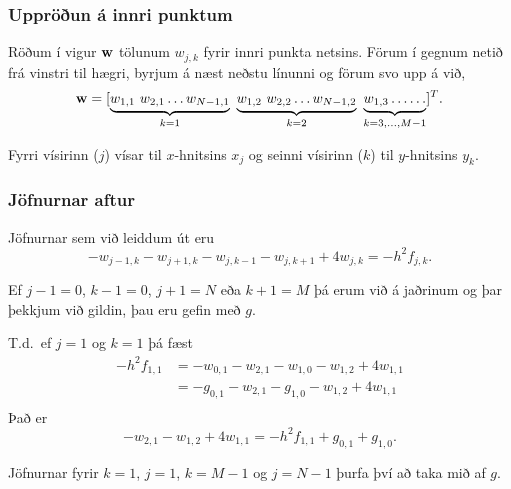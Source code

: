 \documentclass[icelandic,a4paper,12pt]{article}
\begin{document}
\subsubsection{Uppröðun á innri punktum}
 Röðum í vigur $\mbox{${\bf w}$}$ tölunum $w_{j,k}$ fyrir innri punkta netsins. 
 Förum í gegnum netið frá vinstri til hægri, byrjum á 
 næst neðstu línunni og förum svo upp á við,
 $$
  \wv = [ \underbrace{w_{1,1} \ w_{2,1} \ldots w_{N-1,1}}_{k=1} 
  \ \underbrace{w_{1,2} \ w_{2,2} \ldots w_{N-1,2}}_{k=2} \ 
  \underbrace{w_{1,3} \ldots  \ldots}_{k=3,\ldots,M-1} ]^T.
 $$
 
 Fyrri vísirinn ($j$) vísar til $x$-hnitsins $x_j$ og seinni vísirinn ($k$)
 til $y$-hnitsins $y_k$.


\subsubsection{Jöfnurnar aftur}
Jöfnurnar sem við leiddum út eru
 $$
  -w_{j-1,k} - w_{j+1,k} - w_{j,k-1} - w_{j,k+1} + 4w_{j,k} = -h^2 f_{j,k}.
 $$
 \pause\medskip
 
 Ef $j-1=0$, $k-1 =0$, $j+1=N$ eða $k+1=M$ þá erum við á jaðrinum og þar
 þekkjum við gildin, þau eru gefin með $g$.
 \pause\medskip
 
 T.d.~ef $j=1$ og $k=1$ þá fæst 
 \begin{align*}
  -h^2 f_{1,1} &= -w_{0,1} - w_{2,1} - w_{1,0} - w_{1,2} + 4w_{1,1} \\
  &= -g_{0,1} - w_{2,1} - g_{1,0} - w_{1,2} + 4w_{1,1}\\
 \end{align*}\pause
 Það er
 $$
  - w_{2,1} - w_{1,2} + 4w_{1,1} = 
  -h^2 f_{1,1}  + g_{0,1} + g_{1,0}.
 $$
 \pause\medskip
 
Jöfnurnar fyrir $k=1$, $j=1$, $k=M-1$ og $j=N-1$ þurfa því að taka
mið af $g$.
\end{document}

